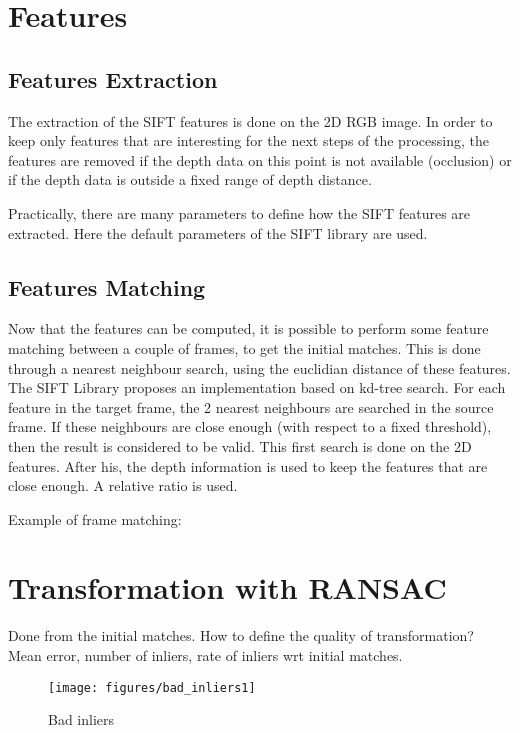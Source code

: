 \documentclass[a4paper,11pt]{kth-mag}
\begin{document}
\section{Features}
\subsection{Features Extraction}

The extraction of the SIFT features is done on the 2D RGB image. In order to keep only features that are interesting for the next steps of the processing, the features are removed if the depth data on this point is not available (occlusion) or if the depth data is outside a fixed range of depth distance.

Practically, there are many parameters to define how the SIFT features are extracted. Here the default parameters of the SIFT library are used.

\subsection{Features Matching}

Now that the features can be computed, it is possible to perform some feature matching between a couple of frames, to get the initial matches. This is done through a nearest neighbour search, using the euclidian distance of these features.  
The SIFT Library proposes an implementation based on kd-tree search. For each feature in the target frame, the 2 nearest neighbours are searched in the source frame. If these neighbours are close enough (with respect to a fixed threshold), then the result is considered to be valid. This first search is done on the 2D features.
After his, the depth information is used to keep the features that are close enough. A relative ratio is used.

Example of frame matching: 

\section{Transformation with RANSAC}

Done from the initial matches.
How to define the quality of transformation? 
Mean error, number of inliers, rate of inliers wrt initial matches.

\begin{figure}[h]
\centering
\texttt{[image: figures/bad\_inliers1]}
\caption{Bad inliers}
\end{figure}
\end{document}
